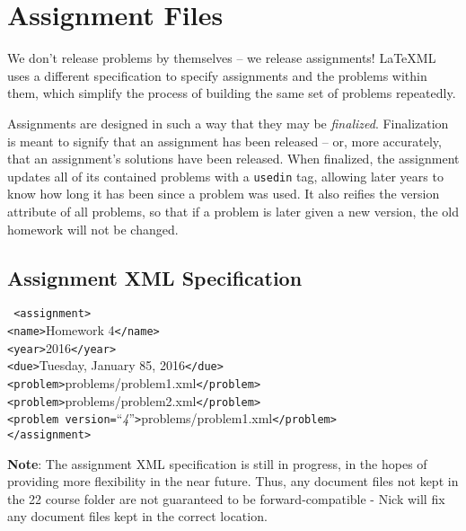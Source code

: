 \section{Assignment Files}
  We don't release problems by themselves -- we release assignments! \LaTeX ML 
  uses a different specification to specify assignments and the problems 
  within them, which simplify the process of building the same set of 
  problems repeatedly.
  
  Assignments are designed in such a way that they may be \textit{finalized}. 
  Finalization is meant to signify that an assignment has been released -- 
  or, more accurately, that an assignment's solutions have been released. 
  When finalized, the assignment updates all of its contained problems with 
  a \texttt{usedin} tag, allowing later years to know how long it has been 
  since a problem was used. It also reifies the version attribute of all 
  problems, so that if a problem is later given a new version, the old 
  homework will not be changed.
  
{
\newcommand\TB{\hspace*{1em}}

  \subsection{Assignment XML Specification}
    \begin{mdframed}
\texttt{
<assignment>\\
\TB<name>}Homework 4\texttt{</name>\\
\TB<year>}2016\texttt{</year>\\
\TB<due>}Tuesday, January 85, 2016\texttt{</due>\\
\TB<problem>}problems/problem1.xml\texttt{</problem>\\
\TB<problem>}problems/problem2.xml\texttt{</problem>\\
\TB<problem version=}``\textit{4}''\texttt{>}problems/problem1.xml\texttt{</problem>\\
</assignment>}
    \end{mdframed}
    
}
    
    \textbf{Note}: The assignment XML specification is still in progress, in 
    the hopes of providing more flexibility in the near future. Thus, any 
    document files not kept in the 22 course folder are not guaranteed to be 
    forward-compatible - Nick will fix any document files kept in the 
    correct location.
    

